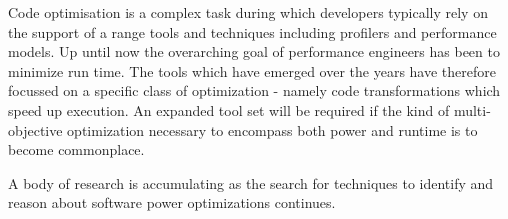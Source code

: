 
Code optimisation is a complex task during which developers typically rely on the support of a range tools and techniques including profilers and performance models. Up until now the overarching goal of performance engineers has been to minimize run time. The tools which have emerged over the years have therefore focussed on a specific class of optimization - namely code transformations which speed up execution. An expanded tool set will be required if the kind of multi-objective optimization necessary to encompass both power and runtime is to become commonplace.

A body of research is accumulating as the search for techniques to identify and reason about software power optimizations continues.
